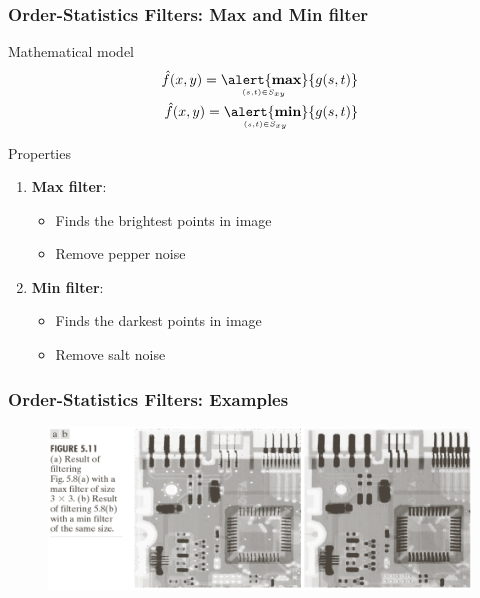 \documentclass[english,11pt,table,handout]{beamer}
\begin{document}
\frame
{
	\frametitle{Order-Statistics Filters: Max and Min filter}
	\begin{block}{Mathematical model}
		\begin{align}
		\nonumber
		\hat{f}(x,y) = \underaccent{(s,t) \in S_{xy}}{\text{\alert{\textbf{max}}}}\{{g(s,t)}\} \\
		\nonumber
		\hat{f}(x,y) = \underaccent{(s,t) \in S_{xy}}{\text{\alert{\textbf{min}}}}\{{g(s,t)}\}
		\end{align}
	\end{block}
	\begin{alertblock}{Properties}
		\begin{enumerate}
			\item \alert{\textbf{Max filter}}: 
			\begin{itemize}
				\item Finds the brightest points in image
				\item Remove pepper noise
			\end{itemize}
			\item \alert{\textbf{Min filter}}:
			\begin{itemize}
				\item Finds the darkest points in image
				\item Remove salt noise
			\end{itemize}
		\end{enumerate}
	\end{alertblock}
}
\frame
{
	\frametitle{Order-Statistics Filters: Examples }
	\begin{figure}[!h]
		\includegraphics[scale=0.6]{max_min_demo.png}
	\end{figure}
	
}
\frame
\end{document}
